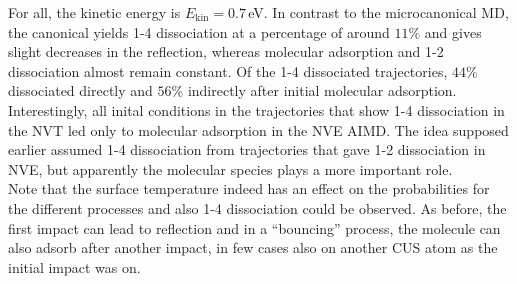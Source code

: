 \documentclass[11pt,DIV=13,BCOR=5mm,a4paper,headinclude]{scrbook}
\begin{document}
For all, the kinetic energy is $E_\textrm{kin}=0.7\,$eV.
In contrast to the microcanonical MD, the canonical yields 1-4 dissociation at a percentage of around $11\%$ and gives slight decreases in the reflection, whereas molecular adsorption and 1-2 dissociation almost remain constant.
Of the 1-4 dissociated trajectories, $44\%$ dissociated directly and $56\%$ indirectly after initial molecular adsorption.
Interestingly, all inital conditions in the trajectories that show 1-4 dissociation in the NVT led only to molecular adsorption in the NVE AIMD.
The idea supposed earlier assumed 1-4 dissociation from trajectories that gave 1-2 dissociation in NVE, but apparently the molecular species plays a more important role.
\\
Note that the surface temperature indeed has an effect on the probabilities for the different processes and also 1-4 dissociation could be observed.
As before, the first impact can lead to reflection and in a ``bouncing'' process, the molecule can also adsorb after another impact, in few cases also on another CUS atom as the initial impact was on.
 
\end{document}
